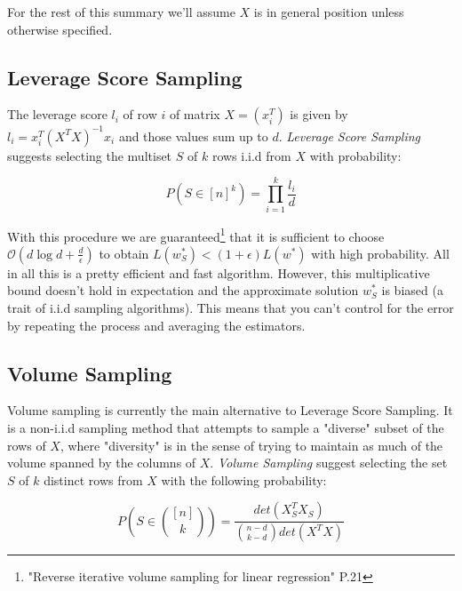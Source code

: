 \documentclass{article}
\begin{document}
            For the rest of this summary we'll assume $X$ is in general position unless otherwise specified.

        \subsection{Leverage Score Sampling}
            The leverage score $l_{i}$ of row $i$ of matrix $X=(x_{i}^T)$ is given by $l_{i}=x_{i}^T(X^TX)^{-1}x_{i}$ and those
            values sum up to $d$.
            \textit{Leverage Score Sampling} suggests selecting the multiset $S$ of $k$ rows i.i.d from $X$ with probability:

            \begin{equation}
                P(S\in{[n]^k})=\prod_{i=1}^{k}\frac{l_{i}}{d}
            \end{equation}

            With this procedure we are guaranteed\footnote{\label{leverage_score_performance_1}"Reverse iterative volume
            sampling for linear regression" P.21} that it is sufficient to choose
            $\mathcal{O}(d\log{d}+\frac{d}{\epsilon})$ to obtain $L(w_{S}^\ast) < (1+\epsilon)L(w^\ast)$ with high probability.
            All in all this is a pretty efficient and fast algorithm.
            However, this multiplicative bound doesn't hold in expectation and the approximate solution $w_{S}^\ast$ is biased (a
            trait of i.i.d sampling algorithms). This means that you can't control for the error by repeating the process
            and averaging the estimators.

        \subsection{Volume Sampling}
            Volume sampling is currently the main alternative to Leverage Score Sampling.
            It is a non-i.i.d sampling method that attempts to sample a "diverse" subset of the rows of $X$,
            where "diversity" is in the sense of trying to maintain as much of the volume spanned by the
            columns of $X$.
            \textit{Volume Sampling} suggest selecting the set $S$ of $k$ distinct rows from $X$ with the following probability:

            \begin{equation}
                P(S\in{\binom{[n]}{k}})=\frac{det(X_{S}^TX_{S})}{\binom{n-d}{k-d}det(X^TX)}
            \end{equation}
\end{document}
